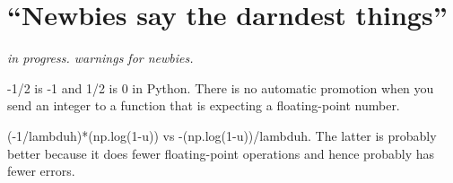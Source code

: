 \chapter{``Newbies say the darndest things''}

\begin{fullwidth}
{\em in progress.  warnings for newbies.}

-1/2 is -1 and 1/2 is 0 in Python.  There is no automatic promotion when you send an integer to a function that is expecting a floating-point number.

(-1/lambduh)*(np.log(1-u)) vs -(np.log(1-u))/lambduh. The latter is probably better because it does fewer floating-point operations and hence probably has fewer errors.

\end{fullwidth}
